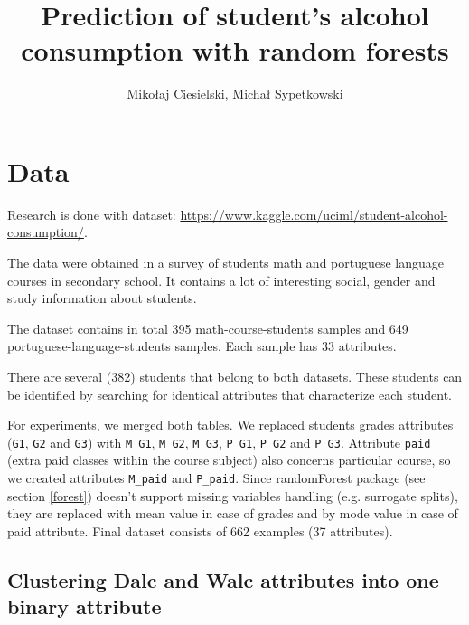 \documentclass[a4paper]{article}
\begin{document}
\title{Prediction of student's alcohol consumption with random forests}

\author{Mikołaj Ciesielski, Michał Sypetkowski}
\setlength\columnsep{0.375in}  \newlength\titlebox \setlength\titlebox{2.25in}
\twocolumn
\maketitle



\section{Data}
\label{data}

Research is done with dataset: \url{https://www.kaggle.com/uciml/student-alcohol-consumption/}.

The data were obtained in a survey of students
math and portuguese language courses in secondary school.
It contains a lot of interesting social,
gender and study information about students.

The dataset contains in total 395 math-course-students samples and 
649 portuguese-language-students samples. Each sample has 33 attributes.

There are several (382) students that belong to both datasets.
These students can be identified by searching for identical attributes
that characterize each student.

For experiments, we merged both tables.
We replaced students grades attributes
(\texttt{G1}, \texttt{G2} and \texttt{G3})
with
\texttt{M\_G1},
\texttt{M\_G2},
\texttt{M\_G3},
\texttt{P\_G1},
\texttt{P\_G2} and
\texttt{P\_G3}.
    Attribute \texttt{paid} (extra paid classes within the course subject) also concerns particular course, so we created attributes
\texttt{M\_paid} and \texttt{P\_paid}.
Since randomForest package (see section \ref{forest}) doesn't support missing variables handling (e.g. surrogate splits),
they are replaced with mean value in case of grades and by mode value in case of paid attribute.
Final dataset consists of 662 examples (37 attributes).

\subsection{Clustering Dalc and Walc attributes into one binary attribute}
\label{clust}
\end{document}
